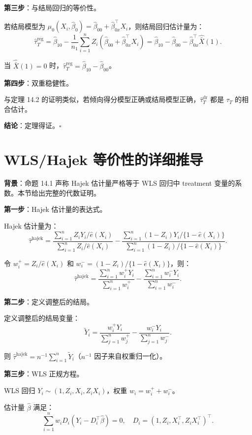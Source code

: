 \textbf{第三步}：与结局回归的等价性。

若结局模型为 $\mu_0(X_i, \hat\beta_0) = \hat\beta_{00} + \hat\beta_{0x}^\top X_i$，则结局回归估计量为：
\[
\hat\tau_T^{\text{reg}} = \hat\beta_{10} - \frac{1}{n_1} \sum_{i=1}^n Z_i (\hat\beta_{00} + \hat\beta_{0x}^\top X_i) = \hat\beta_{10} - \hat\beta_{00} - \hat\beta_{0x}^\top \hat{\bar{X}}(1).
\]

当 $\hat{\bar{X}}(1)=0$ 时，$\hat\tau_T^{\text{reg}} = \hat\beta_{10} - \hat\beta_{00}$。

\textbf{第四步}：双重稳健性。

与定理 14.2 的证明类似，若倾向得分模型正确或结局模型正确，$\hat\tau_T^{\text{dr}}$ 都是 $\tau_T$ 的相合估计。

\textbf{结论}：定理得证。$\square$

\section{WLS/Hajek 等价性的详细推导}\label{sec:appendix-wls-hajek-proof}

\textbf{背景}：命题 14.1 声称 Hajek 估计量严格等于 WLS 回归中 treatment 变量的系数。本节给出完整的代数证明。

\textbf{第一步}：Hajek 估计量的表达式。

Hajek 估计量为：
\[
\hat\tau^{\text{hajek}} = \frac{\sum_{i=1}^n Z_i Y_i / \hat{e}(X_i)}{\sum_{i=1}^n Z_i / \hat{e}(X_i)} - \frac{\sum_{i=1}^n (1-Z_i) Y_i / \{1-\hat{e}(X_i)\}}{\sum_{i=1}^n (1-Z_i) / \{1-\hat{e}(X_i)\}}.
\]

令 $w_i^+ = Z_i / \hat{e}(X_i)$ 和 $w_i^- = (1-Z_i) / \{1-\hat{e}(X_i)\}$，则：
\[
\hat\tau^{\text{hajek}} = \frac{\sum_{i=1}^n w_i^+ Y_i}{\sum_{i=1}^n w_i^+} - \frac{\sum_{i=1}^n w_i^- Y_i}{\sum_{i=1}^n w_i^-}.
\]

\textbf{第二步}：定义调整后的结局。

定义调整后的结局变量：
\[
\tilde{Y}_i = \frac{w_i^+ Y_i}{\sum_{j=1}^n w_j^+} - \frac{w_i^- Y_i}{\sum_{j=1}^n w_j^-}.
\]

则 $\hat\tau^{\text{hajek}} = n^{-1} \sum_{i=1}^n \tilde{Y}_i$（$n^{-1}$ 因子来自权重归一化）。

\textbf{第三步}：WLS 正规方程。

WLS 回归 $Y_i \sim (1, Z_i, X_i, Z_i X_i)$，权重 $w_i = w_i^+ + w_i^-$。

估计量 $\hat\beta$ 满足：
\[
\sum_{i=1}^n w_i D_i (Y_i - D_i^\top \hat\beta) = 0, \quad D_i = (1, Z_i, X_i^\top, Z_i X_i^\top)^\top.
\]

